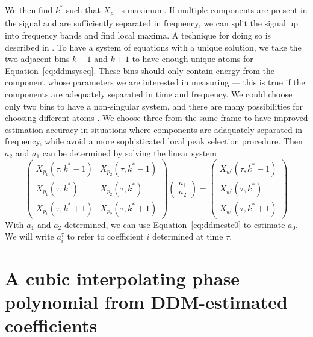 We then find $k^{\ast}$ such that $X_{p_{1}}$ is maximum. If multiple components
are present in the signal and are sufficiently separated in frequency, we can
split the signal up into frequency bands and find local maxima. A technique for
doing so is described in \cite[p.~42]{serra1989system}. To have a system of
equations with a unique solution, we take the two adjacent bins $k-1$ and $k+1$
to have enough unique atoms for Equation~\ref{eq:ddmsyseq}. These bins should
only contain energy from the component whose parameters we are interested in
measuring --- this is true if the components are adequately separated in time
and frequency. We could choose only two bins to have a non-singular system, and
there are many possibilities for choosing different atoms
\cite[p.~4639]{betser2009sinusoidal}. We choose three from the same frame to
have improved estimation accuracy in situations where components are adaquately
separated in frequency, while avoid a more sophisticated local peak selection
procedure. Then $a_2$ and $a_1$ can be determined by solving the linear system
\[
    \begin{pmatrix}
        X_{p_{1}} \left( \tau, k^{\ast} - 1 \right) & X_{p_{2}} \left( \tau, k^{\ast} - 1 \right) \\
        X_{p_{1}} \left( \tau, k^{\ast} \right) & X_{p_{2}} \left( \tau, k^{\ast} \right) \\
        X_{p_{1}} \left( \tau, k^{\ast} + 1 \right) & X_{p_{2}} \left( \tau, k^{\ast} + 1 \right)
    \end{pmatrix}
    \begin{pmatrix}
        a_1 \\
        a_2
    \end{pmatrix}
    =
    \begin{pmatrix}
        X_{w^{\prime}} \left( \tau, k^{\ast} - 1 \right) \\
        X_{w^{\prime}} \left( \tau, k^{\ast} \right) \\
        X_{w^{\prime}} \left( \tau, k^{\ast} + 1 \right)
    \end{pmatrix}
\]
With $a_{1}$ and $a_{2}$ determined, we can use Equation~\ref{eq:ddmestc0} to
estimate $a_0$. We will write $a^{\tau}_{i}$ to refer to coefficient $i$
determined at time $\tau$.

\section{A cubic interpolating phase polynomial from DDM-estimated coefficients}

